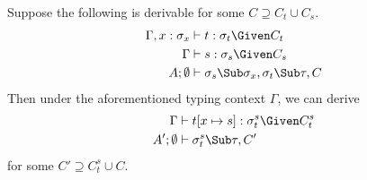 \documentclass{amsart}
\theoremstyle{definition}
\begin{document}
\def\Exi{\emptyset}
\def\s{s}
\def\sigx{\sigma_x}
\def\sigs{\sigma_\s}
\def\sigt{\sigma_t}
\def\sigts{\sigma_t^\s}
\def\Ct{C_t}
\def\Cs{C_\s}
\def\Cts{C_t^\s}

Suppose the following is derivable for some $C\supseteq \Ct\cup \Cs$.
\begin{align}
\Gamma,x:\sigx&\vdash t:\sigt\Given \Ct \notag
\\
\Gamma&\vdash \s:\sigs \Given \Cs \notag
\\
A;\Exi&\vdash
\sigs\Sub\sigx, \sigt\Sub\tau,C
\label{eq:subass}
\end{align}
Then under the aforementioned typing context $\Gamma$, we can
derive
\begin{align*}
\Gamma&\vdash t[x\mapsto\s]:\sigts \Given \Cts\\
A';\Exi&\vdash \sigts\Sub\tau, C'
\end{align*}
for some $C'\supseteq \Cts \cup C$.
\end{document}
